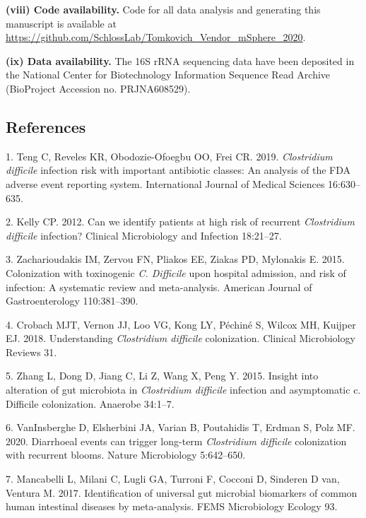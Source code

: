 \documentclass[
  11pt,
]{article}
\begin{document}
\textbf{(viii) Code availability.} Code for all data analysis and
generating this manuscript is available at
\url{https://github.com/SchlossLab/Tomkovich_Vendor_mSphere_2020}.

\textbf{(ix) Data availability.} The 16S rRNA sequencing data have been
deposited in the National Center for Biotechnology Information Sequence
Read Archive (BioProject Accession no. PRJNA608529).

\newpage

\hypertarget{references}{%
\subsection{References}\label{references}}

\hypertarget{refs}{}
\leavevmode\hypertarget{ref-Teng2019}{}%
1. Teng C, Reveles KR, Obodozie-Ofoegbu OO, Frei CR. 2019.
\emph{Clostridium difficile} infection risk with important antibiotic
classes: An analysis of the FDA adverse event reporting system.
International Journal of Medical Sciences 16:630--635.

\leavevmode\hypertarget{ref-Kelly2012}{}%
2. Kelly CP. 2012. Can we identify patients at high risk of recurrent
\emph{Clostridium difficile} infection? Clinical Microbiology and
Infection 18:21--27.

\leavevmode\hypertarget{ref-Zacharioudakis2015}{}%
3. Zacharioudakis IM, Zervou FN, Pliakos EE, Ziakas PD, Mylonakis E.
2015. Colonization with toxinogenic \emph{C. Difficile} upon hospital
admission, and risk of infection: A systematic review and meta-analysis.
American Journal of Gastroenterology 110:381--390.

\leavevmode\hypertarget{ref-Crobach2018}{}%
4. Crobach MJT, Vernon JJ, Loo VG, Kong LY, Péchiné S, Wilcox MH,
Kuijper EJ. 2018. Understanding \emph{Clostridium difficile}
colonization. Clinical Microbiology Reviews 31.

\leavevmode\hypertarget{ref-Zhang2015}{}%
5. Zhang L, Dong D, Jiang C, Li Z, Wang X, Peng Y. 2015. Insight into
alteration of gut microbiota in \emph{Clostridium difficile} infection
and asymptomatic c. Difficile colonization. Anaerobe 34:1--7.

\leavevmode\hypertarget{ref-VanInsberghe2020}{}%
6. VanInsberghe D, Elsherbini JA, Varian B, Poutahidis T, Erdman S, Polz
MF. 2020. Diarrhoeal events can trigger long-term \emph{Clostridium
difficile} colonization with recurrent blooms. Nature Microbiology
5:642--650.

\leavevmode\hypertarget{ref-Mancabelli2017}{}%
7. Mancabelli L, Milani C, Lugli GA, Turroni F, Cocconi D, Sinderen D
van, Ventura M. 2017. Identification of universal gut microbial
biomarkers of common human intestinal diseases by meta-analysis. FEMS
Microbiology Ecology 93.
\end{document}
